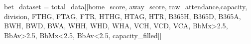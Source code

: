 \documentclass[
  letterpaper,
  DIV=11,
  numbers=noendperiod]{scrartcl}
\newenvironment{Shaded}{\begin{snugshade}}{\end{snugshade}}
\newcommand{\NormalTok}[1]{\textcolor[rgb]{0.00,0.23,0.31}{#1}}
\newcommand{\OperatorTok}[1]{\textcolor[rgb]{0.37,0.37,0.37}{#1}}
\newcommand{\StringTok}[1]{\textcolor[rgb]{0.13,0.47,0.30}{#1}}
\begin{document}
\begin{Shaded}
\begin{Highlighting}[]
\NormalTok{bet\_dataset }\OperatorTok{=}\NormalTok{ total\_data[[}\StringTok{\textquotesingle{}home\_score\textquotesingle{}}\NormalTok{, }\StringTok{\textquotesingle{}away\_score\textquotesingle{}}\NormalTok{,}
        \StringTok{\textquotesingle{}raw\_attendance\textquotesingle{}}\NormalTok{,}\StringTok{\textquotesingle{}capacity\textquotesingle{}}\NormalTok{, }\StringTok{\textquotesingle{}division\textquotesingle{}}\NormalTok{, }\StringTok{\textquotesingle{}FTHG\textquotesingle{}}\NormalTok{, }\StringTok{\textquotesingle{}FTAG\textquotesingle{}}\NormalTok{, }\StringTok{\textquotesingle{}FTR\textquotesingle{}}\NormalTok{, }\StringTok{\textquotesingle{}HTHG\textquotesingle{}}\NormalTok{, }\StringTok{\textquotesingle{}HTAG\textquotesingle{}}\NormalTok{,}
       \StringTok{\textquotesingle{}HTR\textquotesingle{}}\NormalTok{, }\StringTok{\textquotesingle{}B365H\textquotesingle{}}\NormalTok{, }\StringTok{\textquotesingle{}B365D\textquotesingle{}}\NormalTok{, }\StringTok{\textquotesingle{}B365A\textquotesingle{}}\NormalTok{, }\StringTok{\textquotesingle{}BWH\textquotesingle{}}\NormalTok{, }\StringTok{\textquotesingle{}BWD\textquotesingle{}}\NormalTok{, }\StringTok{\textquotesingle{}BWA\textquotesingle{}}\NormalTok{, }\StringTok{\textquotesingle{}WHH\textquotesingle{}}\NormalTok{, }\StringTok{\textquotesingle{}WHD\textquotesingle{}}\NormalTok{,}
       \StringTok{\textquotesingle{}WHA\textquotesingle{}}\NormalTok{, }\StringTok{\textquotesingle{}VCH\textquotesingle{}}\NormalTok{, }\StringTok{\textquotesingle{}VCD\textquotesingle{}}\NormalTok{, }\StringTok{\textquotesingle{}VCA\textquotesingle{}}\NormalTok{, }\StringTok{\textquotesingle{}BbMx\textgreater{}2.5\textquotesingle{}}\NormalTok{, }\StringTok{\textquotesingle{}BbAv\textgreater{}2.5\textquotesingle{}}\NormalTok{, }\StringTok{\textquotesingle{}BbMx\textless{}2.5\textquotesingle{}}\NormalTok{,}
       \StringTok{\textquotesingle{}BbAv\textless{}2.5\textquotesingle{}}\NormalTok{, }\StringTok{\textquotesingle{}capacity\_filled\textquotesingle{}}\NormalTok{]]}


\end{Highlighting}
\end{Shaded}
\end{document}

